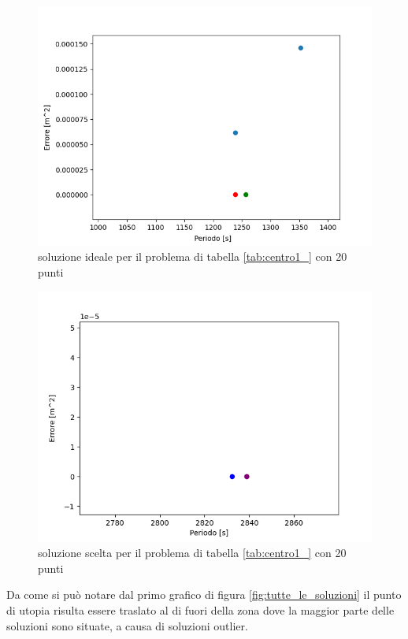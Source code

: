 \documentclass[a4paper,12pt]{report}
\begin{document}
\begin{figure}
  \center
  \includegraphics[scale=0.70]{img/puls005/soluzione_corretta.png}
  \caption{soluzione ideale per il problema di tabella \ref{tab:centro1_} con 20 punti}
  \label{fig:soluzione_corretta}
\end{figure}


\begin{figure}
  \center
  \includegraphics[scale=0.70]{img/puls005/soluzione_scelta.png}
  \caption{soluzione scelta per il problema di tabella \ref{tab:centro1_} con 20 punti}
  \label{fig:soluzione_scelta}
\end{figure}
Da come si può notare dal primo grafico di figura \ref{fig:tutte_le_soluzioni} il punto di utopia risulta essere traslato al di fuori della zona dove la maggior parte delle soluzioni sono situate, a causa di soluzioni outlier.
\end{document}
